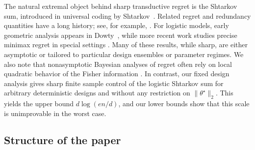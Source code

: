 \documentclass[11pt, letterpaper, hidelinks]{article}
\newcommand{\1}{\mathbf 1}
\theoremstyle{plain}
\theoremstyle{definition}
\newcommand{\thetastar}{\theta^\star}
\begin{document}
The natural extremal object behind sharp transductive regret is the Shtarkov
sum, introduced in universal coding by Shtarkov~\cite{Shtarkov1987}. Related
regret and redundancy quantities have a long history; see, for example,
\cite{Rissanen1996FisherSC}. For logistic models, early geometric analysis
appears in Dowty~\cite{dowty2014volumes}, while more recent work studies
precise minimax regret in special settings
\cite{jacquet2021precise,ShamirSzpankowski2021,JacquetShamirSzpankowski2022,
DrmotaJacquetWuSzpankowski2024,
drmota2025precise,DrmotaJacquetWuSzpankowski2026}. Many of these results, while
sharp, are either asymptotic or tailored to particular design ensembles or
parameter regimes. We also note that nonasymptotic Bayesian analyses of regret
often rely on local quadratic behavior of the Fisher information
\cite{Barron1999BayesPerformance,kakade2005online}. In contrast, our fixed
design analysis gives sharp finite sample control of the logistic Shtarkov sum
for arbitrary deterministic designs and without any restriction on
\(\|\thetastar\|_2\). This yields the upper bound \(d\log(en/d)\), and our
lower bounds show that this scale is unimprovable in the worst case.

\subsection{Structure of the paper}
\end{document}
